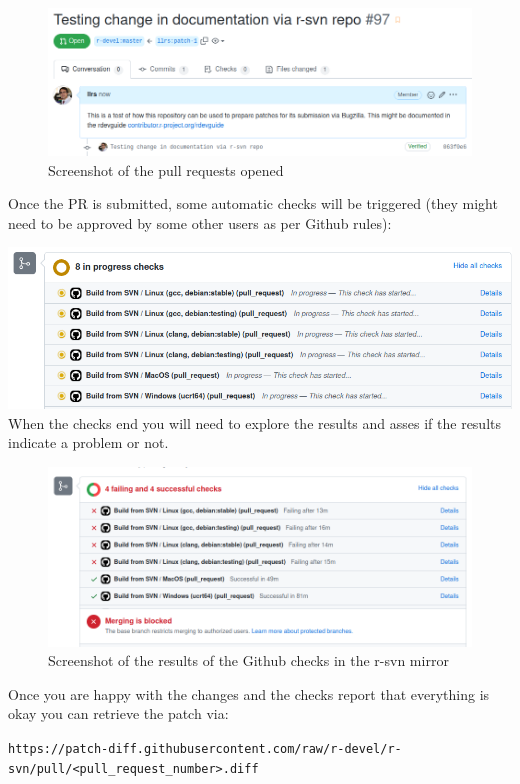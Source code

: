 \documentclass[
]{book}
\begin{document}
\begin{figure}
\centering
\includegraphics{img/rsvn_PR_created.png}
\caption{Screenshot of the pull requests opened}
\end{figure}

Once the PR is submitted, some automatic checks will be triggered (they might need to be approved by some other users as per Github rules):

\includegraphics{img/rsvn_PR_automatic_checks.png}
When the checks end you will need to explore the results and asses if the results indicate a problem or not.

\begin{figure}
\centering
\includegraphics{img/rsvn_checks_results.png}
\caption{Screenshot of the results of the Github checks in the r-svn mirror}
\end{figure}

Once you are happy with the changes and the checks report that everything is okay you can retrieve the patch via:

\texttt{https://patch-diff.githubusercontent.com/raw/r-devel/r-svn/pull/\textless{}pull\_request\_number\textgreater{}.diff}
\end{document}
